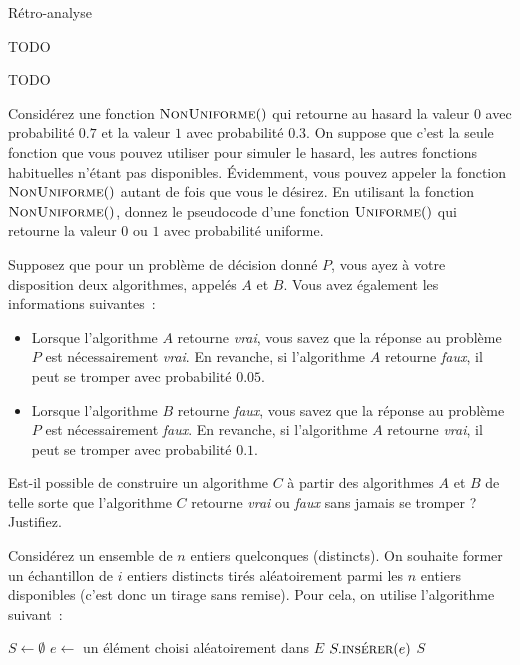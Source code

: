 \documentclass[12pt,addpoints]{exam}
\begin{document}
\begin{questions}
\question
Rétro-analyse

%
\question
TODO

%
\question
TODO


\question
Considérez une fonction $\Call{NonUniforme}$ qui retourne au hasard la valeur $0$ avec probabilité $0.7$ et la valeur $1$ avec probabilité $0.3$. On suppose que c'est la seule fonction que vous pouvez utiliser pour simuler le hasard, les autres fonctions habituelles n'étant pas disponibles. Évidemment, vous pouvez appeler la fonction $\Call{NonUniforme}$ autant de fois que vous le désirez. En utilisant la fonction $\Call{NonUniforme}$, donnez le pseudocode d'une fonction $\Call{Uniforme}$ qui retourne la valeur $0$ ou $1$ avec probabilité uniforme.
\begin{solution}
\end{solution}

\question
Supposez que pour un problème de décision donné $P$, vous ayez à votre disposition deux algorithmes, appelés $A$ et $B$. Vous avez également les informations suivantes~:
\begin{itemize}
  \item Lorsque l'algorithme $A$ retourne \emph{vrai}, vous savez que la réponse au problème $P$ est nécessairement \emph{vrai}. En revanche, si l'algorithme $A$ retourne \emph{faux}, il peut se tromper avec probabilité $0.05$.
  \item Lorsque l'algorithme $B$ retourne \emph{faux}, vous savez que la réponse au problème $P$ est nécessairement \emph{faux}. En revanche, si l'algorithme $A$ retourne \emph{vrai}, il peut se tromper avec probabilité $0.1$.
\end{itemize}
Est-il possible de construire un algorithme $C$ à partir des algorithmes $A$ et $B$ de telle sorte que l'algorithme $C$ retourne \emph{vrai} ou \emph{faux} sans jamais se tromper ? Justifiez.

\question
Considérez un ensemble de $n$ entiers quelconques (distincts). On souhaite former un échantillon de $i$ entiers distincts tirés aléatoirement parmi les $n$ entiers disponibles (c'est donc un tirage sans remise). Pour cela, on utilise l'algorithme suivant~:
\begin{algorithmic}[1]
    \State $S \gets \emptyset$
      \State $e \gets $ un élément choisi aléatoirement dans $E$
        \State $S.\Call{insérer}{e}$
      \EndIf
    \EndWhile
    \State \Return $S$
  \EndFunction
\end{algorithmic}
\begin{parts}

\end{parts}
\end{questions}
\end{document}
